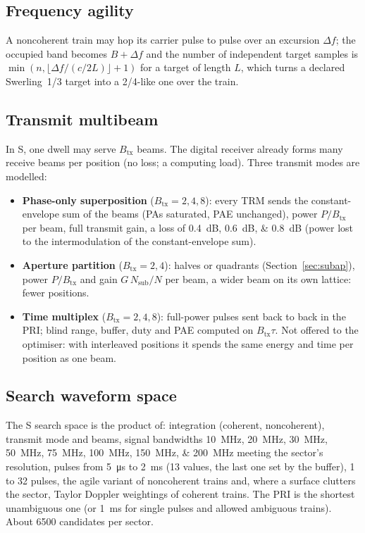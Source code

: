 \documentclass[11pt,a4paper]{article}
\begin{document}
\subsection{Frequency agility}
A noncoherent train may hop its carrier pulse to pulse over an excursion $\Delta f$; the occupied band becomes
$B + \Delta f$ and the number of independent target samples is $\min(n, \lfloor \Delta f/(c/2L)\rfloor + 1)$ for a
target of length $L$, which turns a declared Swerling~1/3 target into a 2/4-like one over the train.

\subsection{Transmit multibeam}\label{sec:multibeam}
In S, one dwell may serve $B_{\mathrm{tx}}$ beams. The digital receiver already forms many receive beams per position
(no loss; a computing load). Three transmit modes are modelled:
\begin{itemize}
  \item \textbf{Phase-only superposition} ($B_{\mathrm{tx}} = 2, 4, 8$): every TRM sends the constant-envelope sum of the
        beams (PAs saturated, PAE unchanged), power $P/B_{\mathrm{tx}}$ per beam, full transmit gain, a loss of
        \SIlist{0.4;0.6;0.8}{dB} (power lost to the intermodulation of the constant-envelope sum).
  \item \textbf{Aperture partition} ($B_{\mathrm{tx}} = 2, 4$): halves or quadrants (Section~\ref{sec:subap}), power
        $P/B_{\mathrm{tx}}$ and gain $G\,N_{\mathrm{sub}}/N$ per beam, a wider beam on its own lattice: fewer positions.
  \item \textbf{Time multiplex} ($B_{\mathrm{tx}} = 2, 4, 8$): full-power pulses sent back to back in the PRI; blind
        range, buffer, duty and PAE computed on $B_{\mathrm{tx}}\tau$. Not offered to the optimiser: with interleaved
        positions it spends the same energy and time per position as one beam.
\end{itemize}

\subsection{Search waveform space}
The S search space is the product of: integration (coherent, noncoherent), transmit mode and beams, signal bandwidths
\SIlist{10;20;30;50;75;100;150;200}{MHz} meeting the sector's resolution, pulses from \SI{5}{\micro s} to \SI{2}{ms}
(13 values, the last one set by the buffer), 1 to 32 pulses, the agile variant of noncoherent trains and, where a
surface clutters the sector, Taylor Doppler weightings of coherent trains. The PRI is the shortest unambiguous one
(or \SI{1}{ms} for single pulses and allowed ambiguous trains). About \num{6500} candidates per sector.
\end{document}
